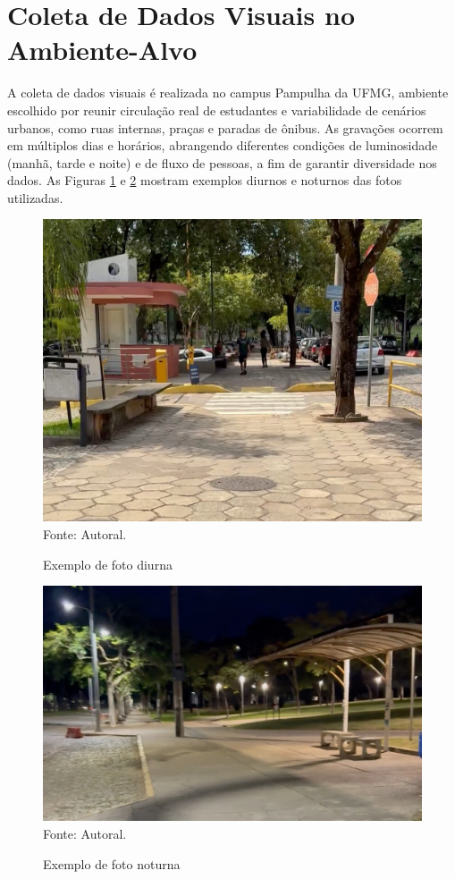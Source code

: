 \section{Coleta de Dados Visuais no Ambiente-Alvo}

A coleta de dados visuais é realizada no campus Pampulha da UFMG, ambiente escolhido por reunir circulação real de estudantes e variabilidade de cenários urbanos, como ruas internas, praças e paradas de ônibus. As gravações ocorrem em múltiplos dias e horários, abrangendo diferentes condições de luminosidade (manhã, tarde e noite) e de fluxo de pessoas, a fim de garantir diversidade nos dados. As Figuras \ref{fg-exe_grav_dia} e \ref{fg-exe_grav_noite} mostram exemplos diurnos e noturnos das fotos utilizadas.

\begin{figure}[htbp]
  \centering
  \caption{Exemplo de foto diurna}
  \includegraphics[width=0.8 \textwidth]{Figuras/exe_grav_dia - Editado.jpg}
  \\
  Fonte: Autoral.
  \label{fg-exe_grav_dia}
\end{figure}

\begin{figure}[htbp]
  \centering
  \caption{Exemplo de foto noturna}
  \includegraphics[width=0.8 \textwidth]{Figuras/exe_grav_noite - Editado.jpg}
  \\
  Fonte: Autoral.
  \label{fg-exe_grav_noite}
\end{figure}

